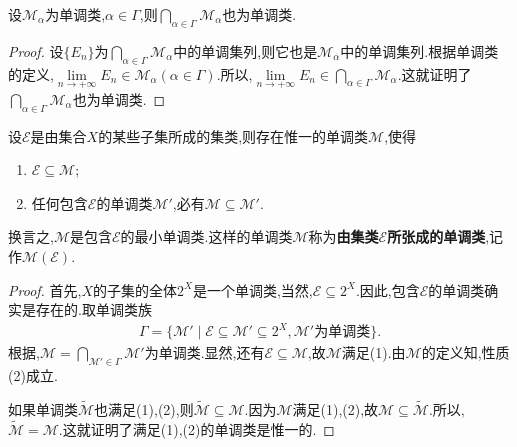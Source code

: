 \documentclass[../../main.tex]{subfiles}%
\begin{document}
\begin{theorem}\label{theorem:单调类的交仍是单调类}
设$\mathscr{M}_\alpha$为单调类,$\alpha \in \Gamma$,则$\bigcap_{\alpha \in \Gamma} \mathscr{M}_\alpha$也为单调类.
\end{theorem}
\begin{proof}

设$\{E_n\}$为$\bigcap_{\alpha \in \Gamma} \mathscr{M}_\alpha$中的单调集列,则它也是$\mathscr{M}_\alpha$中的单调集列.根据单调类的定义,$\lim\limits_{n \to +\infty} E_n \in \mathscr{M}_\alpha(\alpha \in \Gamma)$.所以,$\lim\limits_{n \to +\infty} E_n \in \bigcap_{\alpha \in \Gamma} \mathscr{M}_\alpha$.这就证明了$\bigcap_{\alpha \in \Gamma} \mathscr{M}_\alpha$也为单调类.

\end{proof}

\begin{theorem}
设$\mathscr{E}$是由集合$X$的某些子集所成的集类,则存在惟一的单调类$\mathscr{M}$,使得
\begin{enumerate}[(1)]
\item $\mathscr{E} \subseteq \mathscr{M}$;
\item 任何包含$\mathscr{E}$的单调类$\mathscr{M}'$,必有$\mathscr{M} \subseteq \mathscr{M}'$.
\end{enumerate}
换言之,$\mathscr{M}$是包含$\mathscr{E}$的最小单调类.这样的单调类$\mathscr{M}$称为\textbf{由集类$\mathscr{E}$所张成的单调类},记作$\mathscr{M}(\mathscr{E})$.
\end{theorem}
\begin{proof}

首先,$X$的子集的全体$2^X$是一个单调类,当然,$\mathscr{E} \subseteq 2^X$.因此,包含$\mathscr{E}$的单调类确实是存在的.取单调类族
\begin{align*}
\Gamma = \{\mathscr{M}' \mid \mathscr{E} \subseteq \mathscr{M}' \subseteq 2^X, \mathscr{M}' \text{为单调类}\}.
\end{align*}
根据,$\mathscr{M} = \bigcap_{\mathscr{M}' \in \Gamma} \mathscr{M}'$为单调类.显然,还有$\mathscr{E} \subseteq \mathscr{M}$,故$\mathscr{M}$满足(1).由$\mathscr{M}$的定义知,性质(2)成立.

如果单调类$\widetilde{\mathscr{M}}$也满足(1),(2),则$\widetilde{\mathscr{M}} \subseteq \mathscr{M}$.因为$\mathscr{M}$满足(1),(2),故$\mathscr{M} \subseteq \widetilde{\mathscr{M}}$.所以,$\widetilde{\mathscr{M}} = \mathscr{M}$.这就证明了满足(1),(2)的单调类是惟一的.

\end{proof}
\end{document}
